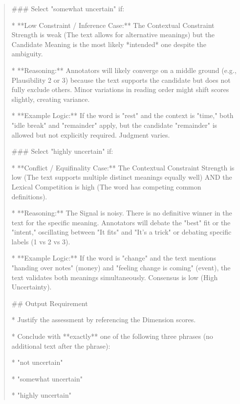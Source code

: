\begin{quote}
### Select "somewhat uncertain" if:

*   **Low Constraint / Inference Case:** The Contextual Constraint Strength is weak (The text allows for alternative meanings) but the Candidate Meaning is the most likely *intended* one despite the ambiguity.

*   **Reasoning:** Annotators will likely converge on a middle ground (e.g., Plausibility 2 or 3) because the text supports the candidate but does not fully exclude others. Minor variations in reading order might shift scores slightly, creating variance.

*   **Example Logic:** If the word is "rest" and the context is "time," both "idle break" and "remainder" apply, but the candidate "remainder" is allowed but not explicitly required. Judgment varies.



### Select "highly uncertain" if:

*   **Conflict / Equifinality Case:** The Contextual Constraint Strength is low (The text supports multiple distinct meanings equally well) AND the Lexical Competition is high (The word has competing common definitions).

*   **Reasoning:** The Signal is noisy. There is no definitive winner in the text for the specific meaning. Annotators will debate the "best" fit or the "intent," oscillating between "It fits" and "It's a trick" or debating specific labels (1 vs 2 vs 3).

*   **Example Logic:** If the word is "change" and the text mentions "handing over notes" (money) and "feeling change is coming" (event), the text validates both meanings simultaneously. Consensus is low (High Uncertainty).



## Output Requirement

*   Justify the assessment by referencing the Dimension scores.

*   Conclude with **exactly** one of the following three phrases (no additional text after the phrase):

    *   "not uncertain"

    *   "somewhat uncertain"

    *   "highly uncertain"
\end{quote}
